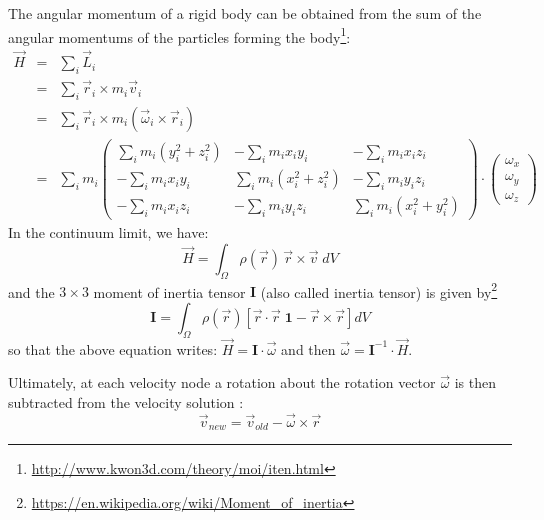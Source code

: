 The angular momentum of a rigid body can be obtained from the sum 
of the angular momentums of the particles forming the 
body\footnote{\url{http://www.kwon3d.com/theory/moi/iten.html}}:
\begin{eqnarray}
\vec H 
&=& \sum_i \vec L_i\\
&=& \sum_i \vec r_i \times m_i \vec v_i\\
&=& \sum_i \vec r_i \times m_i (\vec \omega_i \times \vec r_i)\\
&=& \sum_i m_i 
\left(
\begin{array}{ccc}
\sum_i m_i(y_i^2+z_i^2) & -\sum_i m_i x_iy_i & -\sum_i m_i x_i z_i \\
-\sum_i m_i x_iy_i & \sum_i m_i(x_i^2+z_i^2) & -\sum_i m_i y_i z_i \\
-\sum_i m_i x_i z_i & -\sum_i m_i y_i z_i & \sum_i m_i(x_i^2+y_i^2)
\end{array}
\right)
\cdot
\left(
\begin{array}{c}
\omega_x \\ \omega_y \\ \omega_z
\end{array}
\right)
\end{eqnarray}
In the continuum limit, we have:
\begin{equation}
{\vec H} = \int_\Omega \rho(\vec r) \, {\vec r} \times {\vec v}\; dV
\end{equation}
and the $3\times3$ moment of inertia tensor $\bm I$
(also called inertia tensor) is given by\footnote{\url{https://en.wikipedia.org/wiki/Moment\_of\_inertia}}
\begin{equation}
{\bm I}= 
\int_\Omega \rho(\vec r) [\vec r\cdot\vec r \; \bm 1 - \vec r \times \vec r  ] dV
\end{equation}
so that the above equation writes:
$
{\vec H}={\bm I}\cdot {\vec \omega}
$
and then ${\vec \omega}={\bm I}^{-1} \cdot {\vec H}$.

Ultimately, at each velocity node a rotation about the rotation 
vector ${\vec \omega}$ is then subtracted from the velocity 
solution \cite[eq. 26]{zhmt08}:
\begin{equation}
\vec v_{new} = \vec v_{old} - \vec \omega \times \vec r 
\end{equation}



